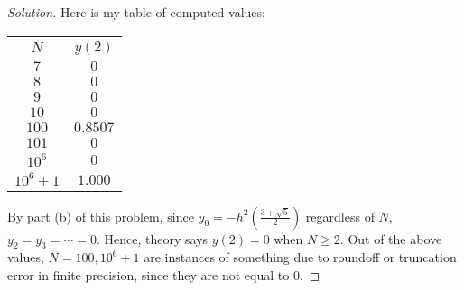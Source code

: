 \documentclass{article}
\begin{document}
\begin{enumerate}
\begin{proof}[Solution]
		Here is my table of computed values:
			\begin{center}
				\begin{tabular}{ | c | c | }
					\hline
					$N$ & $y(2)$ \\
					\hline
					$7$ & $0$ \\ 
					$8$ & $0$ \\  
					$9$ & $0$ \\
					$10$ & $0$ \\
					$100$ & $0.8507$ \\
					$101$ & $0$ \\
					$10^6$ & $0$ \\
					$10^6+1$ & $1.000$ \\
					\hline
				\end{tabular}
			\end{center}
		By part (b) of this problem, since $y_0 = -h^2\left(\frac{3+\sqrt{5}}{2}\right)$
		regardless of $N$, $y_2 = y_3 = \cdots = 0$.
		Hence, theory says $y(2) = 0$ when $N \geq 2$.
		Out of the above values, $N = 100, 10^6+1$ are instances
		of something due to roundoff or truncation error in finite precision,
		since they are not equal to $0$.
	\end{proof}
\end{enumerate}
\end{document}
